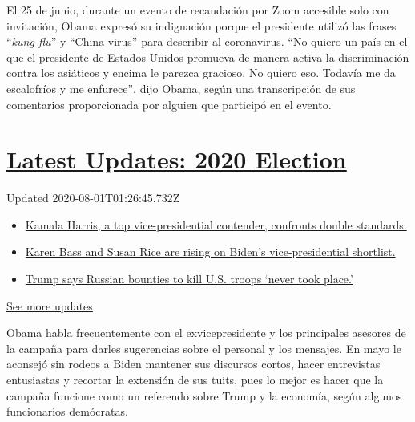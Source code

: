 El 25 de junio, durante un evento de recaudación por Zoom accesible solo
con invitación, Obama expresó su indignación porque el presidente
utilizó las frases ``\emph{kung flu}'' y ``China virus'' para describir
al coronavirus. ``No quiero un país en el que el presidente de Estados
Unidos promueva de manera activa la discriminación contra los asiáticos
y encima le parezca gracioso. No quiero eso. Todavía me da escalofríos y
me enfurece'', dijo Obama, según una transcripción de sus comentarios
proporcionada por alguien que participó en el evento.

\hypertarget{latest-updates-2020-election}{%
\section{\texorpdfstring{\href{https://www.nytimes.com/2020/07/31/us/elections/biden-vs-trump.html?action=click\&pgtype=Article\&state=default\&region=MAIN_CONTENT_1\&context=storylines_live_updates}{Latest
Updates: 2020
Election}}{Latest Updates: 2020 Election}}\label{latest-updates-2020-election}}

Updated 2020-08-01T01:26:45.732Z

\begin{itemize}
\tightlist
\item
  \href{https://www.nytimes.com/2020/07/31/us/elections/biden-vs-trump.html?action=click\&pgtype=Article\&state=default\&region=MAIN_CONTENT_1\&context=storylines_live_updates\#link-29fdff45}{Kamala
  Harris, a top vice-presidential contender, confronts double
  standards.}
\item
  \href{https://www.nytimes.com/2020/07/31/us/elections/biden-vs-trump.html?action=click\&pgtype=Article\&state=default\&region=MAIN_CONTENT_1\&context=storylines_live_updates\#link-13ec3d9c}{Karen
  Bass and Susan Rice are rising on Biden's vice-presidential
  shortlist.}
\item
  \href{https://www.nytimes.com/2020/07/31/us/elections/biden-vs-trump.html?action=click\&pgtype=Article\&state=default\&region=MAIN_CONTENT_1\&context=storylines_live_updates\#link-49e9a016}{Trump
  says Russian bounties to kill U.S. troops `never took place.'}
\end{itemize}

\href{https://www.nytimes.com/2020/07/31/us/elections/biden-vs-trump.html?action=click\&pgtype=Article\&state=default\&region=MAIN_CONTENT_1\&context=storylines_live_updates}{See
more updates}

Obama habla frecuentemente con el exvicepresidente y los principales
asesores de la campaña para darles sugerencias sobre el personal y los
mensajes. En mayo le aconsejó sin rodeos a Biden mantener sus discursos
cortos, hacer entrevistas entusiastas y recortar la extensión de sus
tuits, pues lo mejor es hacer que la campaña funcione como un referendo
sobre Trump y la economía, según algunos funcionarios demócratas.

